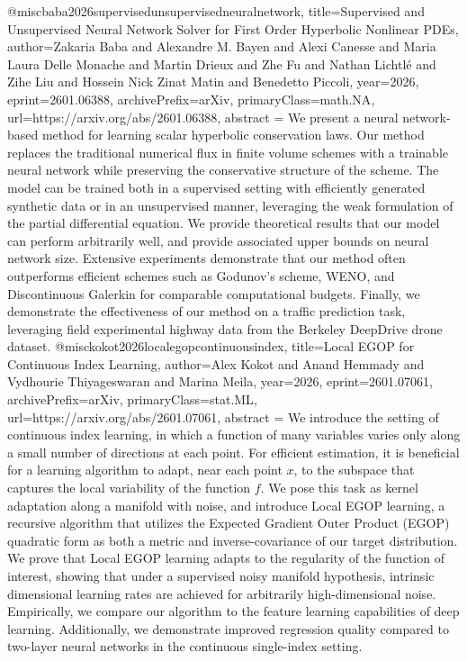 {}@misc{baba2026supervisedunsupervisedneuralnetwork,
      title={Supervised and Unsupervised Neural Network Solver for First Order Hyperbolic Nonlinear PDEs}, 
      author={Zakaria Baba and Alexandre M. Bayen and Alexi Canesse and Maria Laura Delle Monache and Martin Drieux and Zhe Fu and Nathan Lichtlé and Zihe Liu and Hossein Nick Zinat Matin and Benedetto Piccoli},
      year={2026},
      eprint={2601.06388},
      archivePrefix={arXiv},
      primaryClass={math.NA},
      url={https://arxiv.org/abs/2601.06388},
      abstract = {We present a neural network-based method for learning scalar hyperbolic conservation laws. Our method replaces the traditional numerical flux in finite volume schemes with a trainable neural network while preserving the conservative structure of the scheme. The model can be trained both in a supervised setting with efficiently generated synthetic data or in an unsupervised manner, leveraging the weak formulation of the partial differential equation. We provide theoretical results that our model can perform arbitrarily well, and provide associated upper bounds on neural network size. Extensive experiments demonstrate that our method often outperforms efficient schemes such as Godunov's scheme, WENO, and Discontinuous Galerkin for comparable computational budgets. Finally, we demonstrate the effectiveness of our method on a traffic prediction task, leveraging field experimental highway data from the Berkeley DeepDrive drone dataset.}
}@misc{kokot2026localegopcontinuousindex,
      title={Local EGOP for Continuous Index Learning}, 
      author={Alex Kokot and Anand Hemmady and Vydhourie Thiyageswaran and Marina Meila},
      year={2026},
      eprint={2601.07061},
      archivePrefix={arXiv},
      primaryClass={stat.ML},
      url={https://arxiv.org/abs/2601.07061},
      abstract = {We introduce the setting of continuous index learning, in which a function of many variables varies only along a small number of directions at each point. For efficient estimation, it is beneficial for a learning algorithm to adapt, near each point $x$, to the subspace that captures the local variability of the function $f$. We pose this task as kernel adaptation along a manifold with noise, and introduce Local EGOP learning, a recursive algorithm that utilizes the Expected Gradient Outer Product (EGOP) quadratic form as both a metric and inverse-covariance of our target distribution. We prove that Local EGOP learning adapts to the regularity of the function of interest, showing that under a supervised noisy manifold hypothesis, intrinsic dimensional learning rates are achieved for arbitrarily high-dimensional noise. Empirically, we compare our algorithm to the feature learning capabilities of deep learning. Additionally, we demonstrate improved regression quality compared to two-layer neural networks in the continuous single-index setting.}
}
